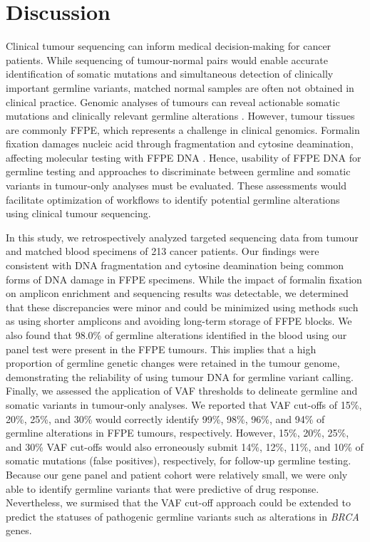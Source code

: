 
\chapter{Discussion}
\label{ch:Discussion}

Clinical tumour sequencing can inform medical decision-making for cancer patients. While sequencing of tumour-normal pairs would enable accurate identification of somatic mutations and simultaneous detection of clinically important germline variants, matched normal samples are often not obtained in clinical practice. Genomic analyses of tumours can reveal actionable somatic mutations and clinically relevant germline alterations \cite{Meric-Bernstam2016, Schrader2015, Jones2015a}. However, tumour tissues are commonly FFPE, which represents a challenge in clinical genomics. Formalin fixation damages nucleic acid through fragmentation and cytosine deamination, affecting molecular testing with FFPE DNA \cite{Do2015a, Kim2017, Ofner2017, Oh2015, Wong2013, Wong2014, Sikorsky2007}. Hence, usability of FFPE DNA for germline testing and approaches to discriminate between germline and somatic variants in tumour-only analyses must be evaluated. These assessments would facilitate optimization of workflows to identify potential germline alterations using clinical tumour sequencing.

In this study, we retrospectively analyzed targeted sequencing data from tumour and matched blood specimens of 213 cancer patients. Our findings were consistent with DNA fragmentation and cytosine deamination being common forms of DNA damage in FFPE specimens. While the impact of formalin fixation on amplicon enrichment and sequencing results was detectable, we determined that these discrepancies were minor and could be minimized using methods such as using shorter amplicons and avoiding long-term storage of FFPE blocks. We also found that 98.0\% of germline alterations identified in the blood using our panel test were present in the FFPE tumours. This implies that a high proportion of germline genetic changes were retained in the tumour genome, demonstrating the reliability of using tumour DNA for germline variant calling. Finally, we assessed the application of VAF thresholds to delineate germline and somatic variants in tumour-only analyses. We reported that VAF cut-offs of 15\%, 20\%, 25\%, and 30\% would correctly identify 99\%, 98\%, 96\%, and 94\% of germline alterations in FFPE tumours, respectively. However, 15\%, 20\%, 25\%, and 30\% VAF cut-offs would also erroneously submit 14\%, 12\%, 11\%, and 10\% of somatic mutations (false positives), respectively, for follow-up germline testing. Because our gene panel and patient cohort were relatively small, we were only able to identify germline variants that were predictive of drug response. Nevertheless, we surmised that the VAF cut-off approach could be extended to predict the statuses of pathogenic germline variants such as alterations in \textit{BRCA} genes.

